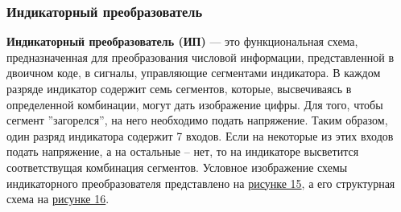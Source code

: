 \documentclass[11pt,a4paper,final]{article} %
\begin{document}
\subsubsection{Индикаторный преобразователь}

\textbf{Индикаторный преобразователь (ИП)} — это функциональная схема, предназначенная для преобразования числовой информации, представленной в двоичном коде, в сигналы, управляющие сегментами индикатора. В каждом разряде индикатор содержит семь сегментов, которые, высвечиваясь в определенной комбинации, могут дать изображение цифры. Для того, чтобы сегмент ''загорелся'', на него необходимо подать напряжение. Таким образом, один разряд индикатора содержит 7 входов. Если на некоторые из этих входов подать напряжение, а на остальные -- нет, то на индикаторе высветится соответствущая комбинация сегментов. Условное изображение схемы индикаторного преобразователя представлено на \hyperref[fig:IC1]{рисунке 15}, а его структурная схема на \hyperref[fig:IC2]{рисунке 16}.
\end{document}
